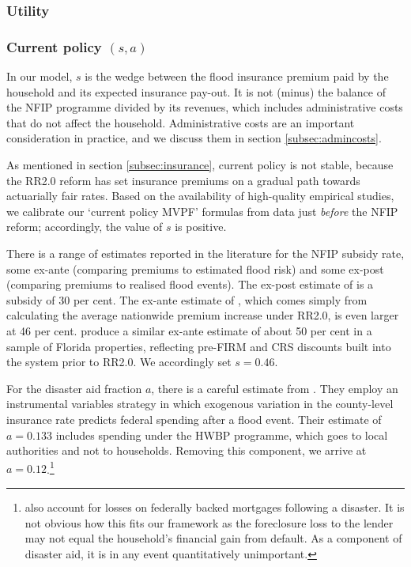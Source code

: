 \documentclass[12pt]{article}
\begin{document}
\subsubsection{Utility}

\subsubsection{Current policy $(s,a)$}

In our model, $s$ is the wedge between the flood insurance premium paid by the household and its expected insurance pay-out. It is not (minus) the balance of the NFIP programme divided by its revenues, which includes administrative costs that do not affect the household. Administrative costs are an important consideration in practice, and we discuss them in section \ref{subsec:admincosts}.

As mentioned in section \ref{subsec:insurance}, current policy is not stable, because the RR2.0 reform has set insurance premiums on a gradual path towards actuarially fair rates. Based on the availability of high-quality empirical studies, we calibrate our `current policy MVPF' formulas from data just \textit{before} the NFIP reform; accordingly, the value of $s$ is positive.

There is a range of estimates reported in the literature for the NFIP subsidy rate, some ex-ante (comparing premiums to estimated flood risk) and some ex-post (comparing premiums to realised flood events). The ex-post estimate of \cite{wagner2022adaptation} is a subsidy of 30 per cent. The ex-ante estimate of \cite{gruber2026optimal}, which comes simply from calculating the average nationwide premium increase under RR2.0, is even larger at 46 per cent. \cite{bakkensen2020sorting} produce a similar ex-ante estimate of about 50 per cent in a sample of Florida properties, reflecting pre-FIRM and CRS discounts built into the system prior to RR2.0. We accordingly set $s=0.46$. 

For the disaster aid fraction $a$, there is a careful estimate from \cite{gruber2026optimal}. They employ an instrumental variables strategy in which exogenous variation in the county-level insurance rate predicts federal spending after a flood event. Their estimate of $a=0.133$ includes spending under the HWBP programme, which goes to local authorities and not to households. Removing this component, we arrive at $a=0.12$.\footnote{\cite{gruber2026optimal} also account for losses on federally backed mortgages following a disaster. It is not obvious how this fits our framework as the foreclosure loss to the lender may not equal the household's financial gain from default. As a component of disaster aid, it is in any event quantitatively unimportant.}  
\end{document}
